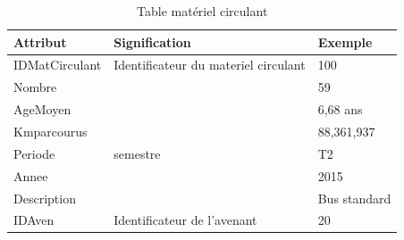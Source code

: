 \documentclass[a4paper]{report}
\begin{document}
\begin{doublespace}
	\begin{table}[H]
		\begin{center}
			\begin{tabularx}{17.5cm}{|X|X|X|}
				\hline
				\textbf{Attribut} & \textbf{Signification}               &
				\textbf{Exemple}                                                        \\
				\hline
				IDMatCirculant    & Identificateur du materiel circulant &
				100                                                                     \\
				\hline
				Nombre            &                                      & 59           \\
				\hline
				AgeMoyen          &                                      & 6,68 ans     \\
				\hline
				Kmparcourus       &                                      & 88,361,937   \\
				\hline
				Periode           & semestre                             & T2           \\
				\hline
				Annee             &                                      & 2015         \\
				\hline
				Description       &                                      & Bus standard \\
				\hline
				IDAven            & Identificateur de l'avenant          & 20           \\
				\hline
			\end{tabularx}
			\caption{Table matériel circulant}
		\end{center}
	\end{table}


\end{doublespace}
\end{document}
